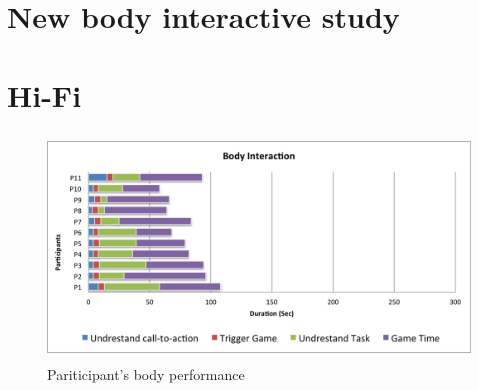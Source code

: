 






\section {New body interactive study}

\label{AppendixE} 
\setcounter{figure}{0}








\section {Hi-Fi }
\label{AppendixB} 
\setcounter{figure}{0}

\begin{figure}[H]
    \centering
    \includegraphics[width=12cm,height=6cm]{Appendices/6/body_performance}%
    \caption{Pariticipant's body performance}%
    \label{fig:body_performance}%
\end{figure}


